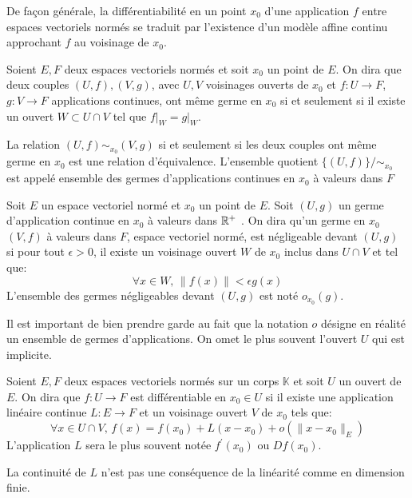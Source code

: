 De façon générale, la différentiabilité en un point $x_0$ d'une application $f$ entre espaces vectoriels normés se traduit par l'existence d'un modèle affine continu approchant $f$ au voisinage de $x_0$.
\begin{defn}
Soient $E,F$ deux espaces vectoriels normés et soit $x_0$ un point de $E$. On dira que deux couples $(U,f),(V,g)$, avec $U,V$ voisinages ouverts de $x_0$ et $f\colon U \to F$,$g \colon V \to F$ applications continues, ont même germe en $x_0$ si et seulement si il existe un ouvert $W \subset U \cap V$ tel que $f\rvert_{W}=g\rvert_{W}$.
\end{defn}
\begin{prop}
La relation $(U,f) \sim_{x_0} (V,g)$ si et seulement si les deux couples ont même germe en $x_0$ est une relation d'équivalence. L'ensemble quotient $\{(U,f)\} / \sim_{x_0}$ est appelé ensemble des germes d'applications continues en $x_0$ à valeurs dans $F$ 
\end{prop}
\begin{defn}
Soit $E$ un espace vectoriel normé et $x_0$ un point de $E$. Soit $(U,g)$ un germe d'application continue en $x_0$ à valeurs dans $\mathbb R^+$ . On dira qu'un germe en $x_0$ $(V,f)$ à valeurs dans $F$, espace vectoriel normé,  est négligeable devant $(U,g)$ si pour tout $\epsilon > 0$, il existe un voisinage ouvert $W$ de $x_0$ inclus dans $U\cap V$ et tel que:
\[
\forall x \in W, \, \|f(x)\| < \epsilon g(x)
\]
L'ensemble des germes négligeables devant $(U,g)$ est noté $o_{x_0}(g)$.
\end{defn}
\begin{rem}
Il est important de bien prendre garde au fait que la notation $o$ désigne en réalité un ensemble de germes d'applications. On omet le plus souvent l'ouvert $U$ qui est implicite. \end{rem}
\begin{fdefn}
Soient $E,F$ deux espaces vectoriels normés sur un corps $\mathbb{K}$
 et soit $U$ un ouvert de $E$. On dira que $f \colon U \to F$ est différentiable en $x_0 \in U$ si il existe une application linéaire continue $L \colon E \to F$ et un voisinage ouvert $V$ de $x_0$ tels que:
 \[
 \forall x \in U \cap V, \, f(x) = f(x_0) + L(x-x_0) + o(\|x-x_0\|_E)
 \]
 L'application $L$ sera le plus souvent notée $f^\prime(x_0)$ ou $Df(x_0).$
\end{fdefn}
\begin{rem}
La continuité de $L$ n'est pas une conséquence de la linéarité comme en dimension finie. 
\end{rem}

